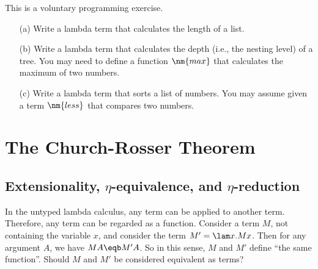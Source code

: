 \documentclass[12pt]{article}
\begin{document}
\begin{exercise}
  This is a voluntary programming exercise.
  \begin{enumerate}
  \item[(a)] Write a lambda term that calculates the length of a
    list.
  \item[(b)] Write a lambda term that calculates the depth (i.e., the
    nesting level) of a tree. You may need to define a function
    $\nm{max}$ that calculates the maximum of two numbers.
  \item[(c)] Write a lambda term that sorts a list of numbers. You
    may assume given a term $\nm{less}$ that compares two numbers. 
  \end{enumerate}
\end{exercise}

\section{The Church-Rosser Theorem}

\subsection{Extensionality, $\eta$-equivalence, and $\eta$-reduction}

In the untyped lambda calculus, any term can be applied to another
term. Therefore, any term can be regarded as a function.  Consider a
term $M$, not containing the variable $x$, and consider the term
$M'=\lam x.Mx$. Then for any argument $A$, we have $MA\eqb M'A$. So in
this sense, $M$ and $M'$ define ``the same function''.  Should $M$ and
$M'$ be considered equivalent as terms?
\end{document}
